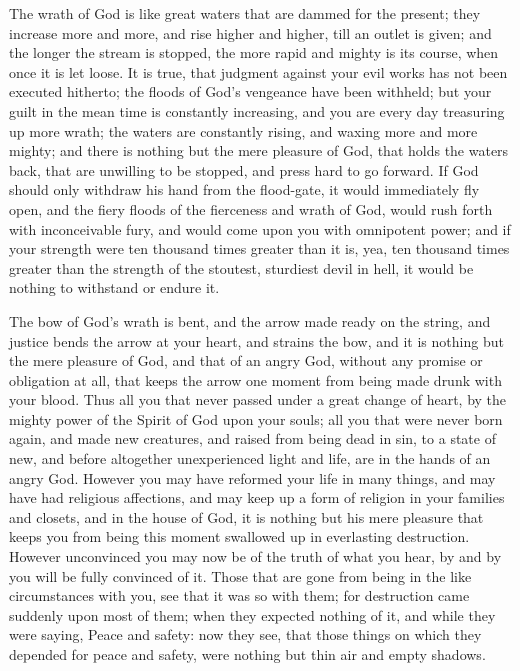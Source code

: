 \documentclass[
]{book}
\begin{document}
The wrath of God is like great waters that are dammed for the present; they increase more and more, and rise higher and higher, till an outlet is given; and the longer the stream is stopped, the more rapid and mighty is its course, when once it is let loose. It is true, that judgment against your evil works has not been executed hitherto; the floods of God's vengeance have been withheld; but your guilt in the mean time is constantly increasing, and you are every day treasuring up more wrath; the waters are constantly rising, and waxing more and more mighty; and there is nothing but the mere pleasure of God, that holds the waters back, that are unwilling to be stopped, and press hard to go forward. If God should only withdraw his hand from the flood-gate, it would immediately fly open, and the fiery floods of the fierceness and wrath of God, would rush forth with inconceivable fury, and would come upon you with omnipotent power; and if your strength were ten thousand times greater than it is, yea, ten thousand times greater than the strength of the stoutest, sturdiest devil in hell, it would be nothing to withstand or endure it.

The bow of God's wrath is bent, and the arrow made ready on the string, and justice bends the arrow at your heart, and strains the bow, and it is nothing but the mere pleasure of God, and that of an angry God, without any promise or obligation at all, that keeps the arrow one moment from being made drunk with your blood. Thus all you that never passed under a great change of heart, by the mighty power of the Spirit of God upon your souls; all you that were never born again, and made new creatures, and raised from being dead in sin, to a state of new, and before altogether unexperienced light and life, are in the hands of an angry God. However you may have reformed your life in many things, and may have had religious affections, and may keep up a form of religion in your families and closets, and in the house of God, it is nothing but his mere pleasure that keeps you from being this moment swallowed up in everlasting destruction. However unconvinced you may now be of the truth of what you hear, by and by you will be fully convinced of it. Those that are gone from being in the like circumstances with you, see that it was so with them; for destruction came suddenly upon most of them; when they expected nothing of it, and while they were saying, Peace and safety: now they see, that those things on which they depended for peace and safety, were nothing but thin air and empty shadows.
\end{document}
